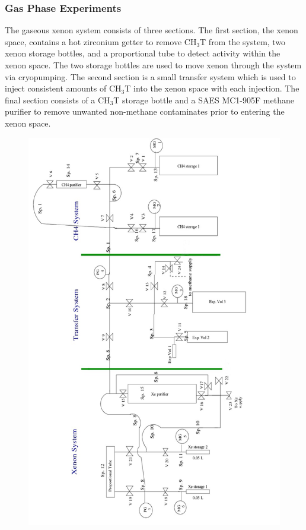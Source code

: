 \subsubsection{Gas Phase Experiments}

The gaseous xenon system consists of three sections. The first section, the xenon space, contains a hot zirconium getter to remove CH$_3$T from the system, two xenon storage bottles, and a proportional tube to detect activity within the xenon space.  The two storage bottles are used to move xenon through the system via cryopumping.  The second section is a small transfer system which is used to inject consistent amounts of CH$_3$T into the xenon space with each injection. The final section consists of a CH$_3$T storage bottle and a SAES MC1-905F methane purifier to remove unwanted non-methane contaminates prior to entering the xenon space.  

\begin{figure}
\includegraphics[scale=.55]{GasSystem.png} 
\label{UMDGasSystem}
\end{figure}

